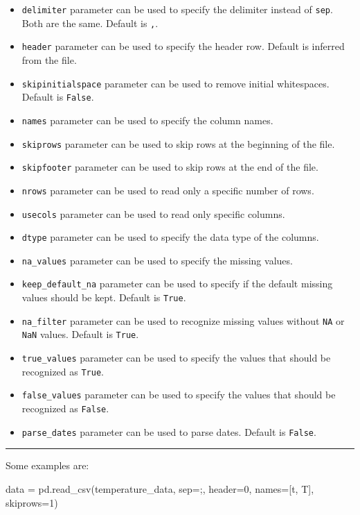 \documentclass[
  letterpaper,
  DIV=11,
  numbers=noendperiod]{scrreprt}
\newenvironment{Shaded}{\begin{snugshade}}{\end{snugshade}}
\newcommand{\DecValTok}[1]{\textcolor[rgb]{0.68,0.00,0.00}{#1}}
\newcommand{\NormalTok}[1]{\textcolor[rgb]{0.00,0.23,0.31}{#1}}
\newcommand{\OperatorTok}[1]{\textcolor[rgb]{0.37,0.37,0.37}{#1}}
\newcommand{\StringTok}[1]{\textcolor[rgb]{0.13,0.47,0.30}{#1}}
\begin{document}
\begin{itemize}
\item
  \texttt{delimiter} parameter can be used to specify the delimiter
  instead of \texttt{sep}. Both are the same. Default is \texttt{,}.
\item
  \texttt{header} parameter can be used to specify the header row.
  Default is inferred from the file.
\item
  \texttt{skipinitialspace} parameter can be used to remove initial
  whitespaces. Default is \texttt{False}.
\item
  \texttt{names} parameter can be used to specify the column names.
\item
  \texttt{skiprows} parameter can be used to skip rows at the beginning
  of the file.
\item
  \texttt{skipfooter} parameter can be used to skip rows at the end of
  the file.
\item
  \texttt{nrows} parameter can be used to read only a specific number of
  rows.
\item
  \texttt{usecols} parameter can be used to read only specific columns.
\item
  \texttt{dtype} parameter can be used to specify the data type of the
  columns.
\item
  \texttt{na\_values} parameter can be used to specify the missing
  values.
\item
  \texttt{keep\_default\_na} parameter can be used to specify if the
  default missing values should be kept. Default is \texttt{True}.
\item
  \texttt{na\_filter} parameter can be used to recognize missing values
  without \texttt{NA} or \texttt{NaN} values. Default is \texttt{True}.
\item
  \texttt{true\_values} parameter can be used to specify the values that
  should be recognized as \texttt{True}.
\item
  \texttt{false\_values} parameter can be used to specify the values
  that should be recognized as \texttt{False}.
\item
  \texttt{parse\_dates} parameter can be used to parse dates. Default is
  \texttt{False}.
\end{itemize}

\begin{center}\rule{0.5\linewidth}{0.5pt}\end{center}

Some examples are:

\begin{Shaded}
\begin{Highlighting}[]
\NormalTok{data }\OperatorTok{=}\NormalTok{ pd.read\_csv(temperature\_data, sep}\OperatorTok{=}\StringTok{\textquotesingle{};\textquotesingle{}}\NormalTok{, header}\OperatorTok{=}\DecValTok{0}\NormalTok{, names}\OperatorTok{=}\NormalTok{[}\StringTok{\textquotesingle{}t\textquotesingle{}}\NormalTok{, }\StringTok{\textquotesingle{}T\textquotesingle{}}\NormalTok{], skiprows}\OperatorTok{=}\DecValTok{1}\NormalTok{)}
\end{Highlighting}
\end{Shaded}
\end{document}
